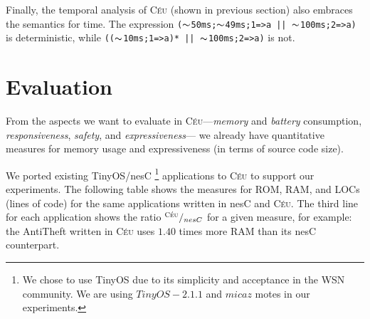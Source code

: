\documentclass[10pt]{sigplan-proc-varsize-sensys11}
\newcommand{\2}{\;\;}
\newcommand{\5}{\;\;\;\;\;}
\newcommand{\til}{$\thicksim$}
\newcommand{\CEU}{\textsc{C\'{e}u}}
\newcommand{\code}[1] {{\small{\texttt{#1}}}}
\begin{document}
Finally, the temporal analysis of \CEU{} (shown in previous section) also 
embraces the semantics for time.
The expression \code{(\til{}50ms;\til{}49ms;1=>a~||~\til{}100ms;2=>a)}
is deterministic, while \code{((\til{}10ms;1=>a)*~||~\til{}100ms;2=>a)} is not.

\section{Evaluation}
\label{sec.evaluation}

\newcommand{\fr}{{\small$^{\CEU}/_{nesC}$}}
\newcommand{\s}[1]{{\small \textbf{#1}}}

From the aspects we want to evaluate in \CEU ---\emph{memory} and 
\emph{battery} consumption, \emph{responsiveness}, \emph{safety}, and 
\emph{expressiveness}--- we already have quantitative measures for memory usage 
and expressiveness (in terms of source code size).

We ported existing TinyOS/nesC%
\footnote {
    We chose to use TinyOS due to its simplicity and acceptance in the WSN 
    community.
    We are using $TinyOS-2.1.1$ and $micaz$ motes in our experiments.
}%
\cite{wsn.tos} applications to \CEU{} to support our experiments.
The following table shows the measures for ROM, RAM, and LOCs (lines of code) 
for the same applications written in nesC and \CEU{}.
The third line for each application shows the ratio \fr{} for a given measure, 
for example: the AntiTheft written in \CEU{} uses $1.40$ times more RAM than 
its nesC counterpart.
\end{document}
